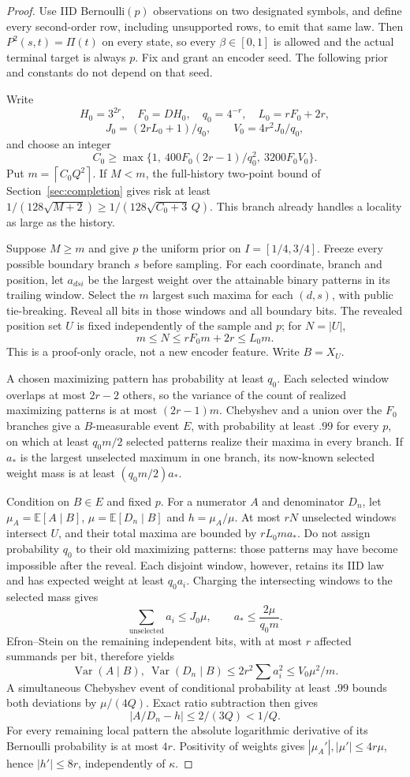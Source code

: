 \documentclass[11pt,letterpaper]{article}
\theoremstyle{definition}\newtheorem{definition}[theorem]{Definition}
\theoremstyle{remark}\newtheorem{remark}[theorem]{Remark}
\newcommand{\E}{\mathbb{E}}
\newcommand{\Var}{\operatorname{Var}}
\newcommand{\ceil}[1]{\left\lceil #1\right\rceil}
\begin{document}
\begin{proof}
Use IID Bernoulli$(p)$ observations on two designated symbols, and define every second-order row, including unsupported rows, to emit that same law. Then $P^2(s,t)=\Pi(t)$ on every state, so every $\beta\in[0,1]$ is allowed and the actual terminal target is always $p$. Fix and grant an encoder seed. The following prior and constants do not depend on that seed.

Write
\[
 H_0=3^{2r},\quad F_0=DH_0,\quad q_0=4^{-r},\quad L_0=rF_0+2r,
\]
\[
 J_0=(2rL_0+1)/q_0,\qquad V_0=4r^2J_0/q_0,
\]
and choose an integer
\[
 C_0\ge\max\{1,\ 400F_0(2r-1)/q_0^2,\ 3200F_0V_0\}.
\]
Put $m=\ceil{C_0Q^2}$. If $M<m$, the full-history two-point bound of Section~\ref{sec:completion} gives risk at least
$1/(128\sqrt{M+2})\ge1/(128\sqrt{C_0+3}\,Q)$.
This branch already handles a locality as large as the history.

Suppose $M\ge m$ and give $p$ the uniform prior on $I=[1/4,3/4]$. Freeze every possible boundary branch $s$ before sampling. For each coordinate, branch and position, let $a_{dsi}$ be the largest weight over the attainable binary patterns in its trailing window. Select the $m$ largest such maxima for each $(d,s)$, with public tie-breaking. Reveal all bits in those windows and all boundary bits. The revealed position set $U$ is fixed independently of the sample and $p$; for $N=|U|$,
\[
 m\le N\le rF_0m+2r\le L_0m.
\]
This is a proof-only oracle, not a new encoder feature. Write $B=X_U$.

A chosen maximizing pattern has probability at least $q_0$. Each selected window overlaps at most $2r-2$ others, so the variance of the count of realized maximizing patterns is at most $(2r-1)m$. Chebyshev and a union over the $F_0$ branches give a $B$-measurable event $E$, with probability at least $.99$ for every $p$, on which at least $q_0m/2$ selected patterns realize their maxima in every branch. If $a_*$ is the largest unselected maximum in one branch, its now-known selected weight mass is at least $(q_0m/2)a_*$.

Condition on $B\in E$ and fixed $p$. For a numerator $A$ and denominator $D_n$, let $\mu_A=\E[A\mid B]$, $\mu=\E[D_n\mid B]$ and $h=\mu_A/\mu$. At most $rN$ unselected windows intersect $U$, and their total maxima are bounded by $rL_0ma_*$. Do not assign probability $q_0$ to their old maximizing patterns: those patterns may have become impossible after the reveal. Each disjoint window, however, retains its IID law and has expected weight at least $q_0a_i$. Charging the intersecting windows to the selected mass gives
\[
 \sum_{\mathrm{unselected}}a_i\le J_0\mu,\qquad
 a_*\le\frac{2\mu}{q_0m}.
\]
Efron--Stein on the remaining independent bits, with at most $r$ affected summands per bit, therefore yields
\[
 \Var(A\mid B),\ \Var(D_n\mid B)
 \le2r^2\sum a_i^2\le V_0\mu^2/m.
\]
A simultaneous Chebyshev event of conditional probability at least $.99$ bounds both deviations by $\mu/(4Q)$. Exact ratio subtraction then gives
\[
 |A/D_n-h|\le 2/(3Q)<1/Q.
\]
For every remaining local pattern the absolute logarithmic derivative of its Bernoulli probability is at most $4r$. Positivity of weights gives
$|\mu_A'|,|\mu'|\le4r\mu$, hence $|h'|\le8r$, independently of $\kappa$.


\end{proof}
\end{document}
